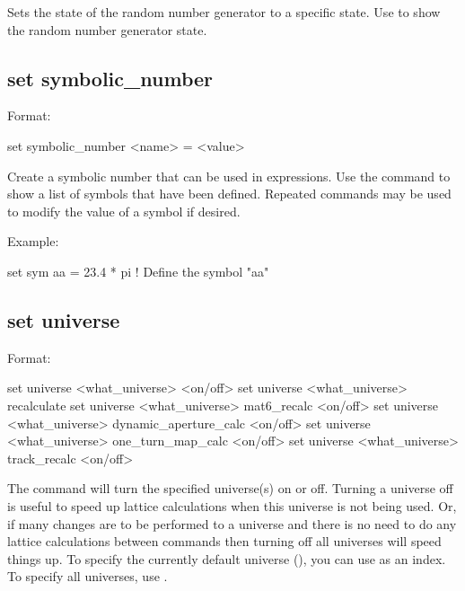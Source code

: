 {{Sets the state of the random number generator to a specific state. Use  to show the random number generator state.


\subsection{set symbolic_number}
\label{s:set.symbolic}

Format:
\begin{example}
  set symbolic_number <name> = <value>
\end{example}

Create a symbolic number that can be used in expressions. Use the  command
to show a list of symbols that have been defined. Repeated  commands may be used to modify
the value of a symbol if desired.

Example:
\begin{example}
  set sym aa = 23.4 * pi  ! Define the symbol "aa"
\end{example}


\subsection{set universe}
\label{s:set.universe}

Format:
\begin{example}
  set universe <what_universe> <on/off> 
  set universe <what_universe> recalculate
  set universe <what_universe> mat6_recalc <on/off>
  set universe <what_universe> dynamic_aperture_calc <on/off>
  set universe <what_universe> one_turn_map_calc <on/off>
  set universe <what_universe> track_recalc <on/off>
\end{example}

The  command will turn the specified universe(s)
on or off. Turning a universe off is useful to speed up lattice calculations when this
universe is not being used. Or, if many changes are to be performed to a universe and
there is no need to do any lattice calculations between commands then turning off all
universes will speed things up. To specify the currently default universe
(), you can use  as an index. To specify all universes, use
\vn{*}.

}}
